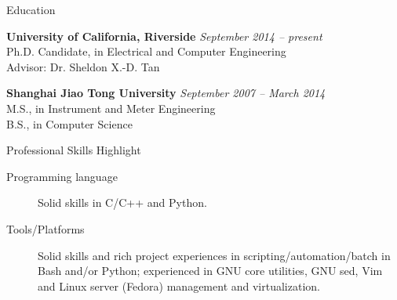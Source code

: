 \documentclass{resume} %
\begin{document}

\begin{rSection}{Education}

{\bf University of California, Riverside} \hfill {\em September 2014 -- present} \\
Ph.D. Candidate, in Electrical and Computer Engineering \\
Advisor: Dr. Sheldon X.-D. Tan

{\bf Shanghai Jiao Tong University} \hfill {\em September 2007 -- March 2014} \\
M.S., in Instrument and Meter Engineering\\
B.S., in Computer Science

\end{rSection}

\begin{rSection}{Professional Skills Highlight}

    \begin{description}

        \item [Programming language] Solid skills in C/C++ and Python.

        \item [Tools/Platforms] Solid skills and rich project experiences in
            scripting/automation/batch in Bash and/or Python; experienced in
            GNU core utilities, GNU sed, Vim and Linux server (Fedora)
            management and virtualization.

    \end{description}

\end{rSection}

\end{document}
